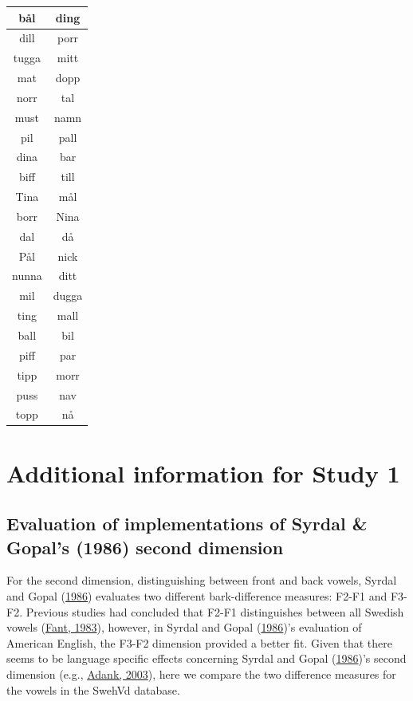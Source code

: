 \documentclass[utf8]{frontiersSCNS}
\begin{document}
\begin{table}
\begin{tabular}[t]{c|c}
\hline
bål&ding\\
\hline
dill&porr\\
\hline
tugga&mitt\\
\hline
mat&dopp\\
\hline
norr&tal\\
\hline
must&namn\\
\hline
pil&pall\\
\hline
dina&bar\\
\hline
biff&till\\
\hline
Tina&mål\\
\hline
borr&Nina\\
\hline
dal&då\\
\hline
Pål&nick\\
\hline
nunna&ditt\\
\hline
mil&dugga\\
\hline
ting&mall\\
\hline
ball&bil\\
\hline
piff&par\\
\hline
tipp&morr\\
\hline
puss&nav\\
\hline
topp&nå\\
\end{tabular}
\end{table}

\hypertarget{additional-information-for-study-1}{%
\section{Additional information for Study 1}\label{additional-information-for-study-1}}

\hypertarget{sec:SG-eval}{%
\subsection*{Evaluation of implementations of Syrdal \& Gopal's (1986) second dimension}\label{sec:SG-eval}}

For the second dimension, distinguishing between front and back vowels, Syrdal and Gopal (\protect\hyperlink{ref-Syrdal1986}{1986}) evaluates two different bark-difference measures: F2-F1 and F3-F2. Previous studies had concluded that F2-F1 distinguishes between all Swedish vowels (\protect\hyperlink{ref-fant1983}{Fant, 1983}), however, in Syrdal and Gopal (\protect\hyperlink{ref-Syrdal1986}{1986})'s evaluation of American English, the F3-F2 dimension provided a better fit. Given that there seems to be language specific effects concerning Syrdal and Gopal (\protect\hyperlink{ref-Syrdal1986}{1986})'s second dimension (e.g., \protect\hyperlink{ref-adank2003}{Adank, 2003}), here we compare the two difference measures for the vowels in the SwehVd database.
\end{document}
